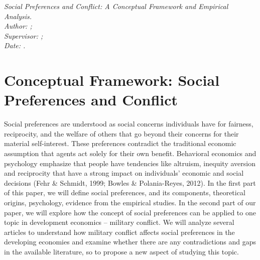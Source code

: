 \documentclass[14pt]{article}
\theoremstyle{remark}
\newcommand{\todayYYMMDD}{\the\year-\the\month-\the\day}
\begin{document}
\hfill
\begin{center}
\textit{Social Preferences and Conflict: A Conceptual Framework and Empirical Analysis.}\\
\textit{Author: ;}\\
\textit{Supervisor: ;}\\
\textit{Date: .}
\end{center}



\tableofcontents
\newpage 

\section{Conceptual Framework: Social Preferences and Conflict}

Social preferences are understood as social concerns individuals have for fairness, reciprocity, and the welfare of others that go beyond their concerns for their material self-interest. These preferences contradict the traditional economic assumption that agents act solely for their own benefit. Behavioral economics and psychology emphasize that people have tendencies like altruism, inequity aversion and reciprocity that have a strong impact on individuals' economic and social decisions (Fehr \& Schmidt, 1999; Bowles \& Polania-Reyes, 2012). In the first part of this paper, we will define social preferences, and its components, theoretical origins, psychology, evidence from the empirical studies. In the second part of our paper, we will explore how the concept of social preferences can be applied to one topic in development economics -- military conflict. We will analyze several articles to understand how military conflict affects social preferences in the developing economies and examine whether there are any contradictions and gaps in the available literature, so to propose a new aspect of studying this topic.
\end{document}
